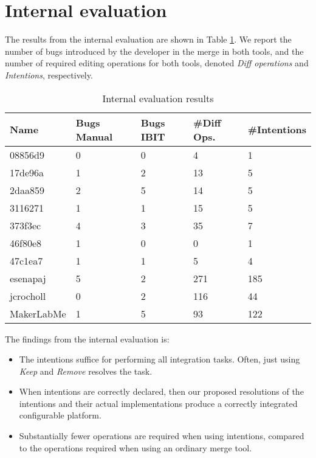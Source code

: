 \section{Internal evaluation}
The results from the internal evaluation are shown in Table \ref{tab:internalres}. We report the number of bugs introduced by the developer in the merge in both tools, and the number of required editing operations for both tools, denoted \textit{Diff operations} and \textit{Intentions}, respectively. 

\begin{table}[h]
    \centering
    \caption{Internal evaluation results}
    \label{tab:internalres}
    \begin{tabular}{l|llll}
\hline\hline
\textbf{Name} & \textbf{Bugs Manual} & \textbf{Bugs IBIT} & \textbf{\#Diff Ops.} & \textbf{\#Intentions}\\
\hline
08856d9      & 0     & 0     & 4     & 1     \\
17de96a      & 1     & 2     & 13    & 5     \\
2daa859      & 2     & 5     & 14    & 5     \\
3116271      & 1     & 1     & 15    & 5     \\
373f3ec      & 4     & 3     & 35    & 7     \\
46f80e8      & 1     & 0     & 0     & 1     \\
47c1ea7      & 1     & 1     & 5     & 4     \\
\hline
esenapaj     & 5     & 2     & 271   & 185   \\ %
jcrocholl    & 0     & 2     & 116   & 44    \\
MakerLabMe   & 1     & 5     & 93    & 122   \\ %
\hline\hline
    \end{tabular}
\end{table}

The findings from the internal evaluation is:

\begin{itemize}
    \item The intentions suffice for performing all integration tasks. Often, just using \textit{Keep} and \textit{Remove} resolves the task.
    \item When intentions are correctly declared, then our proposed resolutions of the intentions and their actual implementations produce a correctly integrated configurable platform.
    \item Substantially fewer operations are required when using intentions, compared to the operations required when using an ordinary merge tool.
\end{itemize}

